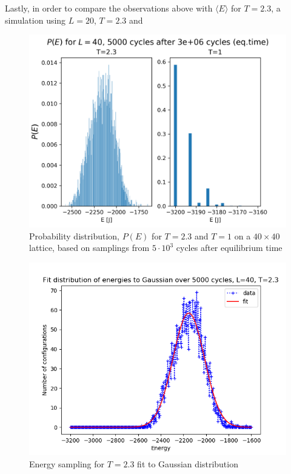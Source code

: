 \documentclass[%
oneside,                 %
final,                   %
10pt]{article}
\begin{document}
Lastly, in order to compare the observations above with $\langle E \rangle$ for $T=2.3$, a simulation using $L=20$, $T=2.3$ and 

\begin{figure}[!htb]
        \centering 
         \includegraphics[scale=.7]{../Results/P(E).png} 
        \caption{Probability distribution, $P(E)$ for $T=2.3$ and $T=1$ on a $40 \times 40$ lattice, based on samplings from $5 \cdot 10^3$ cycles after equilibrium time}
        \label{fig:VAR.normalized}   
\end{figure} 


\begin{figure}[!htb]
        \centering 
         \includegraphics[scale=.6]{../Results/e_var_fit.png} 
        \caption{Energy sampling for $T=2.3$ fit to Gaussian distribution}
        \label{fig:VAR.fit}   
\end{figure}
\end{document}
